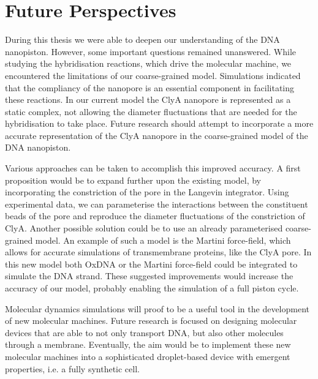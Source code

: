 \section{Future Perspectives}

During this thesis we were able to deepen our understanding of the DNA
nanopiston. However, some important questions remained unanswered. While studying the
hybridisation reactions, which drive the molecular machine, we encountered the
limitations of
our coarse-grained model. Simulations indicated that the compliancy of the nanopore
is an essential component in facilitating these reactions. In our current model the ClyA
nanopore is represented as a static complex, not allowing the diameter fluctuations that
are needed for the hybridisation to take place.
Future research should attempt to incorporate a more accurate representation of the ClyA
nanopore in the coarse-grained model of the DNA nanopiston.

Various approaches can be taken to accomplish this improved accuracy.
A first proposition would be to expand further upon the existing model, by
incorporating the constriction of the pore in the Langevin integrator. Using experimental
data, we can parameterise the interactions between the constituent beads of the pore and
reproduce the diameter fluctuations of the constriction of ClyA. Another
possible solution could be to use an already parameterised coarse-grained model.
An example of such a model is the Martini force-field, which allows for accurate
simulations of
transmembrane proteins, like the ClyA pore. In this new model both OxDNA or the Martini
force-field could be integrated to simulate the DNA strand. These suggested improvements
would increase the accuracy of our model, probably enabling the simulation of a full
piston cycle.

Molecular dynamics simulations will proof to be a useful tool in the development of
new molecular machines. Future research is focused on designing molecular devices that
are able to not only transport DNA, but also other molecules through a membrane.
Eventually, the aim would be to implement these new molecular machines into a
sophisticated droplet-based device with emergent properties, i.e. a fully synthetic cell.

